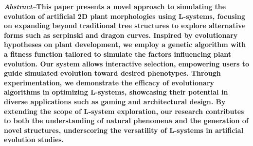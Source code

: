 \textbf{\textit{Abstract--}}\textbf{This paper presents a novel approach to simulating the evolution of artificial 2D plant morphologies using L-systems, focusing on expanding beyond traditional tree structures to explore alternative forms such as serpinski and dragon curves. Inspired by evolutionary hypotheses on plant development, we employ a genetic algorithm with a fitness function tailored to simulate the factors influencing plant evolution. Our system allows interactive selection, empowering users to guide simulated evolution toward desired phenotypes. Through experimentation, we demonstrate the efficacy of evolutionary algorithms in optimizing L-systems, showcasing their potential in diverse applications such as gaming and architectural design. By extending the scope of L-system exploration, our research contributes to both the understanding of natural phenomena and the generation of novel structures, underscoring the versatility of L-systems in artificial evolution studies.}
